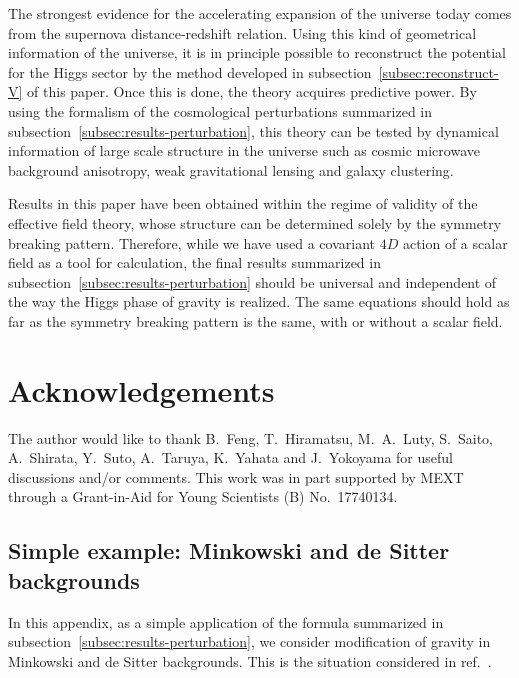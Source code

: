 The strongest evidence for the accelerating expansion of the universe
today comes from the supernova distance-redshift relation. Using this
kind of geometrical information of the universe, it is in principle
possible to reconstruct the potential for the Higgs sector by the method
developed in subsection~\ref{subsec:reconstruct-V} of this paper. Once
this is done, the theory acquires predictive power. By using the
formalism of the cosmological perturbations summarized in 
subsection~\ref{subsec:results-perturbation}, this theory can be tested
by dynamical information of large scale structure in the universe such
as cosmic microwave background anisotropy, weak gravitational lensing
and galaxy clustering. 



Results in this paper have been obtained within the regime of validity
of the effective field theory, whose structure can be determined solely
by the symmetry breaking pattern. Therefore, while we have used a
covariant $4D$ action of a scalar field as a tool for calculation, the
final results summarized in subsection~\ref{subsec:results-perturbation}
should be universal and independent of the way the Higgs phase of
gravity is realized. The same equations should hold as far as the
symmetry breaking pattern is the same, with or without a scalar field. 




\section*{Acknowledgements}

The author would like to thank B.~Feng, T.~Hiramatsu, M.~A.~Luty,
S.~Saito, A.~Shirata, Y.~Suto, A.~Taruya, K.~Yahata and J.~Yokoyama for
useful discussions and/or comments. This work was in part supported by
MEXT through a Grant-in-Aid for Young Scientists (B) No.~17740134. 



\subsection{Simple example: Minkowski and de Sitter backgrounds}
\label{app:example}

In this appendix, as a simple application of the formula summarized in
subsection~\ref{subsec:results-perturbation}, we consider modification
of gravity in Minkowski and de Sitter backgrounds. This is the situation
considered in ref.~\cite{Arkani-Hamed:2003uy}. 

